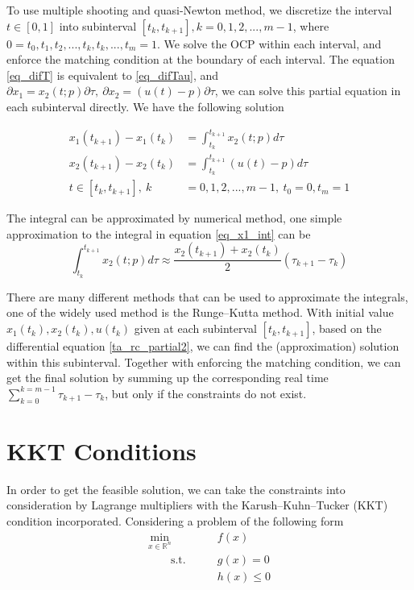 \documentclass  [
  paper    = a4,
  BCOR     = 10mm,
  twoside,
  fontsize = 12pt,
  fleqn,
  toc      = bibnumbered,
  toc      = listofnumbered,
  numbers  = noendperiod,
  headings = normal,
  listof   = leveldown,
  version  = 3.03
]                                       {scrreprt}
\newcommand{\<}{\langle}
\renewcommand{\>}{\rangle}
\begin{document}
   To use multiple shooting and quasi-Newton method, we discretize the interval $t\in [0,1]$ into subinterval $[t_{k}, t_{k+1}], k = 0, 1, 2, ..., m-1$, where $0 = t_0, t_1, t_2, ...,t_k, t_k, ..., t_m = 1$. We solve the OCP within each interval, and enforce the matching condition at the boundary of each interval. 
   The equation \ref{eq_difT} is equivalent to \ref{eq_difTau}, and $\partial x_1= x_2(t;p) \partial \tau, \ \partial x_2 = ( u(t)-p) \partial \tau$, we can solve this partial equation in each subinterval directly. We have the following solution
   
   \begin{subequations}
	\begin{align}
      x_1(t_{k+1}) -  x_1(t_k)  &= \int_{t_k}^{t_{k+1}} x_2(t;p) d \tau \label{eq_x1_int} \\
      x_2(t_{k+1}) -  x_2(t_k)  &= \int_{t_k}^{t_{k+1}} (u(t)-p) d \tau \\
      t \in [t_{k}, t_{k+1}], \  k &= 0, 1, 2, ..., m-1, \  t_0 =0, t_m =1
   	\end{align}
\end{subequations}

The integral can be approximated by numerical method, one simple approximation to the integral in equation \ref{eq_x1_int} can be 
\begin{equation}
\int_{t_k}^{t_{k+1}} x_2(t;p) d \tau  \approx \frac{x_2(t_{k+1}) + x_2(t_k)}{2} (\tau_{k+1} -\tau_k)
\label{mid_approx}
\end{equation}

There are many different methods that can be used to approximate the integrals, one of the widely used method is the Runge–Kutta method. With initial value $x_1(t_k),x_2(t_k), u(t_k)$ given at each subinterval $[t_{k}, t_{k+1}]$, based on the differential equation \ref{ta_rc_partial2}, we can find the (approximation) solution within this subinterval. Together with enforcing the matching condition, we can get the final solution by summing up the corresponding real time $\sum_{k=0}^{k=m-1} \tau_{k+1} - \tau_k$, but only if the constraints do not exist. 


\section{KKT Conditions}
In order to get the feasible solution, we can take the constraints into consideration by Lagrange multipliers with the Karush–Kuhn–Tucker (KKT) condition incorporated. Considering a problem of the following form
\begin{equation}
	\label{eq:OCP_discret_compact}
	\begin{aligned}
		\underset{x \in \mathbb{R}^n}{\text{min}} \qquad &f(x)	\\
		\qquad \text{s.t.}\qquad	&  g(x)	 = 0   \\
						                  &  h(x)	\leq 0 
	\end{aligned}
\end{equation}
\end{document}
